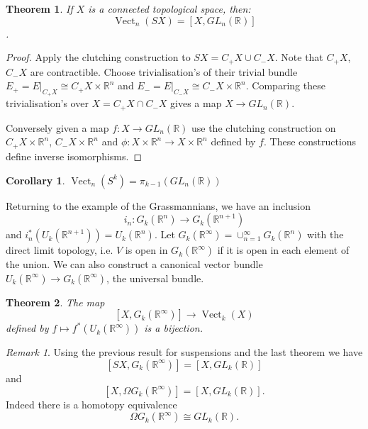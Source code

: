 \documentclass[a4paper,10pt]{article}
\theoremstyle{plain}%
\newtheorem{thm}{Theorem}
\newtheorem{cor}{Corollary}
\theoremstyle{definition}
\theoremstyle{remark}
\newtheorem{rem}{Remark}
\newcommand{\RR}{\mathbb{R}}
\DeclareMathOperator{\Vect}{Vect}
\begin{document}
\begin{thm}
If $X$ is a connected topological space, then: 
$$\Vect_n(SX) = [X, GL_n(\RR)]$$.
\end{thm}

\begin{proof} Apply the clutching construction to $SX = C_+X\cup C_- X$. Note that $C_+ X$, $C_-X$ are contractible. Choose trivialisation's of their trivial bundle $E_+ = E |_{C_+X}\cong C_+X\times \RR^n$ and $E_- = E |_{C_-X}\cong C_-X\times \RR^n.$ Comparing these trivialisation's over $X = C_+X\cap C_- X$ gives a map $X\to GL_n(\RR).$

Conversely given a map $f:X\to GL_n(\RR)$ use the clutching construction on $C_+X\times \RR^n$, $C_-X\times \RR^n$ and $\phi:X\times \RR^n\to X\times\RR^n$ defined by $f$. These constructions define inverse isomorphisms.\end{proof}

\begin{cor}
$\Vect_n(S^ k) =  \pi_{k-1}(GL_n(\RR))$
\end{cor}

Returning to the example of the Grassmannians, we have an inclusion
\[ 
i_n:G_k(\RR^n)\to G_k(\RR^{n+1})
\]
and $i_n^*(U_k(\RR^{n+1}))= U_k(\RR^n).$ Let $G_k(\RR^\infty) = \cup_{n=1}^\infty G_k(\RR^n)$ with the direct limit topology, i.e. $V$ is open in $G_k(\RR^\infty)$ if it is open in each element of the union. We can also construct a canonical vector bundle $U_k(\RR^\infty)\to G_k(\RR^\infty)$, the universal bundle.

\begin{thm}
The map
\[
[X,G_k(\RR^\infty)]\to \Vect_k(X)
\] defined by $f\mapsto f^*(U_k(\RR^\infty))$ is a bijection.
\end{thm}

\begin{rem}
Using the previous result for suspensions and the last theorem we have
\[
[SX, G_k(\RR^\infty)] = [X, GL_k(\RR)]
\]
and
\[
[X, \Omega G_k(\RR^\infty)] = [X, GL_k(\RR)].
\]
Indeed there is a homotopy equivalence
\[
\Omega G_k(\RR^\infty) \cong GL_k(\RR).
\]
\end{rem}
\end{document}
